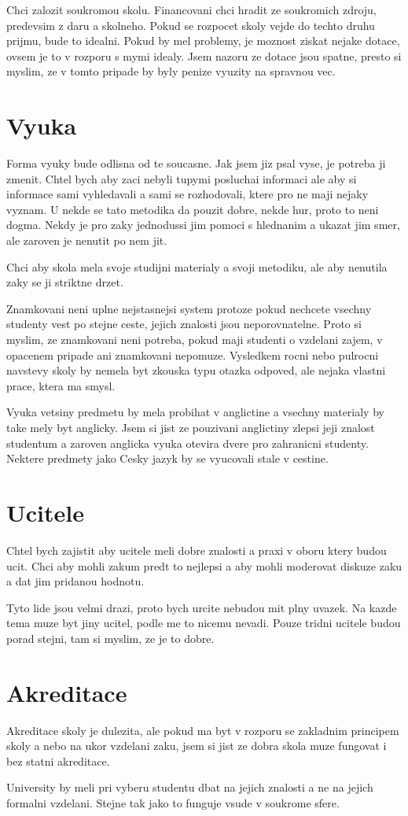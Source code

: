 \documentclass[12pt,a4paper]{article}
\begin{document}
Chci zalozit soukromou skolu. Financovani chci hradit ze soukromich zdroju, predevsim z daru a skolneho. Pokud se rozpocet skoly vejde do techto druhu prijmu, bude to idealni. Pokud by mel problemy, je moznost ziskat nejake dotace, ovsem je to v rozporu s mymi idealy. Jsem nazoru ze dotace jsou spatne, presto si myslim, ze v tomto pripade by byly penize vyuzity na spravnou vec.


\section{Vyuka}

Forma vyuky bude odlisna od te soucasne. Jak jsem jiz psal vyse, je potreba ji zmenit. Chtel bych aby zaci nebyli tupymi posluchai informaci ale aby si informace sami vyhledavali a sami se rozhodovali, ktere pro ne maji nejaky vyznam. U nekde se tato metodika da pouzit dobre, nekde hur, proto to neni dogma. Nekdy je pro zaky jednodussi jim pomoci s hlednanim a ukazat jim smer, ale zaroven je nenutit po nem jit.

Chci aby skola mela svoje studijni materialy a svoji metodiku, ale aby nenutila zaky se ji striktne drzet.

Znamkovani neni uplne nejstasnejsi system protoze pokud nechcete vsechny studenty vest po stejne ceste, jejich znalosti jsou neporovnatelne. Proto si myslim, ze znamkovani neni potreba, pokud maji studenti o vzdelani zajem, v opacenem pripade ani znamkovani nepomuze. Vysledkem rocni nebo pulrocni navstevy skoly by nemela byt zkouska typu otazka odpoved, ale nejaka vlastni prace, ktera ma smysl.

Vyuka vetsiny predmetu by mela probihat v anglictine a vsechny materialy by take mely byt anglicky. Jsem si jist ze pouzivani anglictiny zlepsi jeji znalost studentum a zaroven anglicka vyuka otevira dvere pro zahranicni studenty. Nektere predmety jako Cesky jazyk by se vyucovali stale v cestine.

\section{Ucitele}

Chtel bych zajistit aby ucitele meli dobre znalosti a praxi v oboru ktery budou ucit. Chci aby mohli zakum predt to nejlepsi a aby mohli moderovat diskuze zaku a dat jim pridanou hodnotu.

Tyto lide jsou velmi drazi, proto bych urcite nebudou mit plny uvazek. Na kazde tema muze byt jiny ucitel, podle me to nicemu nevadi. Pouze tridni ucitele budou porad stejni, tam si myslim, ze je to dobre.


\section{Akreditace}

Akreditace skoly je dulezita, ale pokud ma byt v rozporu se zakladnim principem skoly a nebo na ukor vzdelani zaku, jsem si jist ze dobra skola muze fungovat i bez statni akreditace.

University by meli pri vyberu studentu dbat na jejich znalosti a ne na jejich formalni vzdelani. Stejne tak jako to funguje vsude v soukrome sfere.
\end{document}
